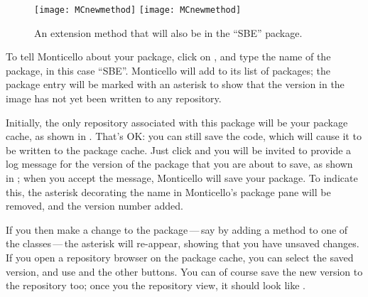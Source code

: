 \documentclass[a4paper,10pt,twoside]{book}
\begin{document}
\begin{figure}[btp]
	\begin{center}
	\ifluluelse
		{\texttt{[image: MCnewmethod]}}
		{\texttt{[image: MCnewmethod]}}
	\end{center}
	\caption{An extension method that will also be in the ``SBE'' package.}
	\label{fig:MCnewmethod}
\end{figure}

To tell Monticello about your package, click on , and type the name of the package, in this case ``SBE''.  Monticello will add  to its list of packages; the package entry will be marked with an asterisk to show that the version in the image has not yet been written to any repository.

Initially, the only repository associated with this package will be your package cache, as shown in .  That's OK: you can still save the code, which will cause it to be written to the package cache.  
Just click  and you will be invited to provide a log message for the version of the package that you are about to save, as shown in ; when you accept the message, Monticello will save your package.
To indicate this, the asterisk decorating the name in Monticello's package pane will be removed, and the version number added.

If you then make a change to the package\,---\,say by adding a method to one of the classes\,---\,the asterisk will re-appear, showing that you have unsaved changes.  If you open a repository browser on the package cache, you can select the saved version, and use  and the other buttons.  
You can of course save the new version to the repository too; once you  the repository view, it should look like .
\end{document}
